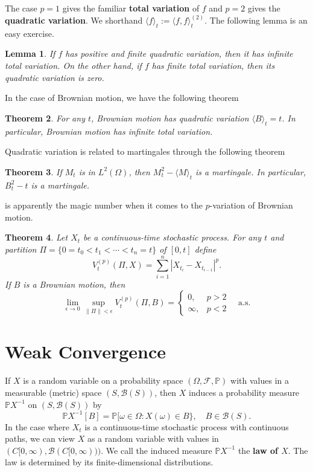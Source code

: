 \documentclass[11pt,letterpaper]{article}
\newcommand{\mcal}[1]{\mathcal{#1}}
\newcommand{\Prob}{\mathbb{P}}
\theoremstyle{plain}
\newtheorem{theorem}{Theorem}[section] %
\newtheorem{lemma}[theorem]{Lemma}
\theoremstyle{definition}
\begin{document}
\noindent The case $p = 1$ gives the familiar \textbf{total variation} of $f$ and $p=2$ gives the \textbf{quadratic variation}. We shorthand $\langle f\rangle_t := \langle f, f \rangle^{(2)}_t$. The following lemma is an easy exercise.

\begin{lemma}
	If $f$ has positive and finite quadratic variation, then it has infinite total variation. On the other hand, if $f$ has finite total variation, then its quadratic variation is zero.
\end{lemma}

\noindent In the case of Brownian motion, we have the following theorem

\begin{theorem}
	For any $t$, Brownian motion has quadratic variation $\langle B \rangle_t = t$. In particular, Brownian motion has infinite total variation.
\end{theorem}

\noindent Quadratic variation is related to martingales through the following theorem

\begin{theorem}
	If $M_t$ is in $L^2(\Omega)$, then $M_t^2 - \langle M\rangle_t$ is a martingale. In particular, $B_t^2 - t$ is a martingale.
\end{theorem}

 is apparently the magic number when it comes to the $p$-variation of Brownian motion.
\begin{theorem}
	Let $X_t$ be a continuous-time stochastic process. For any $t$ and partition $\Pi = \{0 = t_0 < t_1 < \cdots < t_n = t\}$ of $[0,t]$ define
	\[
	V^{(p)}_t(\Pi, X) = \sum_{i=1}^n|X_{t_i} - X_{t_{i-1}}|^p.
	\]
	If $B$ is a Brownian motion, then
	\[
	\lim_{\epsilon\to 0}\sup_{\|\Pi\|<\epsilon}V_t^{(p)}(\Pi, B) = \begin{cases}
		0,&p>2\\
		\infty,&p<2
	\end{cases}\quad\text{a.s.}
	\]
\end{theorem}


\section{Weak Convergence}
If $X$ is a random variable on a probability space $(\Omega, \mcal{F}, \Prob)$ with values in a measurable (metric) space $(S, \mcal{B}(S))$, then $X$ induces a probability measure $\Prob X^{-1}$ on $(S, \mcal{B}(S))$ by
\[
\Prob X^{-1}[B] = \Prob[\omega\in \Omega: X(\omega)\in B\},\quad B\in \mcal{B}(S).
\]
In the case where $X_t$ is a continuous-time stochastic process with continuous paths, we can view $X$ as a random variable with values in $(C[0, \infty), \mcal{B}(C[0, \infty)))$. We call the induced measure $\Prob X^{-1}$ the \textbf{law of $X$}. The law is determined by its finite-dimensional distributions.\\
\end{document}
